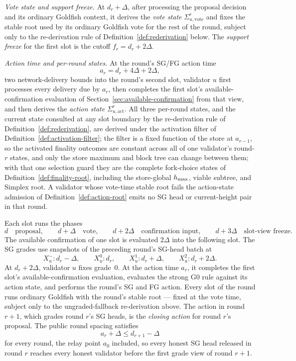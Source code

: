 \begin{definition}
\emph{Vote state and support freeze.}
At \(d_r+\Delta\), after processing the
proposal decision and its ordinary Goldfish context, it derives the
\emph{vote state} \(\Sigma_{u,\mathrm{vote}}^r\) and fixes the stable root
used by its ordinary Goldfish vote for the rest of the round, subject
only to the re-derivation rule of
Definition~\ref{def:rederivation} below.  The
\emph{support freeze} for the first slot is the cutoff
\(f_r=d_r+2\Delta\).

\emph{Action time and per-round states.}
At the round's SG/FG action time
\[
 a_r=d_r+4\Delta+2\Delta,
\]
two network-delivery bounds into the round's second slot, validator \(u\)
first processes every delivery due by \(a_r\), then completes the first slot's
available-confirmation evaluation of
Section~\ref{sec:available-confirmation} from that view, and then
derives the \emph{action state} \(\Sigma_{u,\mathrm{act}}^r\).  All
three per-round states, and the current state consulted at any slot
boundary by the re-derivation rule of Definition~\ref{def:rederivation},
are derived under the
activation filter of Definition~\ref{def:activation-filter}; the filter
is a fixed function of the store at
\(a_{r-1}\), so the activated finality outcomes are constant
across all of one validator's round-\(r\) states, and only the store
maximum and block tree can change between them;
with that one selection guard they are the
complete fork-choice states of Definition~\ref{def:finality-root}, including
the store-global \(h_{\max}\), viable subtree, and Simplex root.  A validator
whose vote-time stable root fails the action-state admission of
Definition~\ref{def:action-root} emits no SG head or
current-height pair in that round.

Each slot runs the phases
\[
 d\quad\text{proposal},\qquad
 d+\Delta\quad\text{vote},\qquad
 d+2\Delta\quad\text{confirmation input},\qquad
 d+3\Delta\quad\text{slot-view freeze}.
\]
The available confirmation of one slot is evaluated \(2\Delta\) into
the following slot.
The SG grades use snapshots of the preceding round's SG-head batch at
\[
 X_u^-:d_r-\Delta,\qquad
 X_u^0:d_r,\qquad
 X_u^1:d_r+\Delta,\qquad
 X_u^2:d_r+2\Delta .
\]
At \(d_r+2\Delta\), validator \(u\) fixes grade~0.  At the action time
\(a_r\), it completes the first slot's available-confirmation evaluation,
evaluates the strong G0 rule against its action state, and performs the
round's SG and FG action.  Every slot of the round runs ordinary Goldfish
with the round's stable root --- fixed at the vote time, subject only to
the ungraded-fallback re-derivation above.
The action in round \(r+1\), which grades round \(r\)'s SG heads, is the
\emph{closing action} for round \(r\)'s proposal.
The public round spacing satisfies
\[
  a_r+\Delta\leq d_{r+1}-\Delta
\]
for every round, the relay point \(a_0\) included,
so every honest SG head released in round \(r\) reaches every honest
validator before the first grade view of round \(r+1\).


\end{definition}
